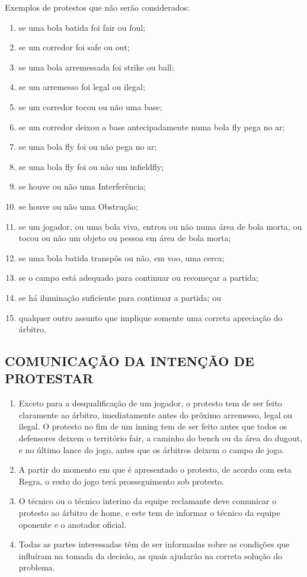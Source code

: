  Exemplos de protestos que não serão considerados:
\begin{exemplo}
\begin{enumerate}[label=(\alph*), itemsep=.75mm]
	\item se uma bola batida foi \gls{fair} ou \gls{foul};
	\item  se um corredor foi \gls{safe} ou \gls{out};
	\item  se uma bola arremessada foi \gls{strike} ou \gls{ball};
	\item  se um arremesso foi legal ou ilegal;
	\item  se um corredor tocou ou não uma base;
	\item  se um corredor deixou a base antecipadamente numa bola \gls{fly} pega no ar;
	\item  se uma bola \gls{fly} foi ou não pega no ar;
	\item  se uma bola \gls{fly} foi ou não um \gls{infieldfly};
	\item  se houve ou não uma Interferência;
	\item  se houve ou não uma Obstrução;
	\item  se um jogador, ou uma bola viva, entrou ou não numa área de bola morta, ou tocou ou não um objeto ou pessoa em área de bola morta;
	\item  se uma bola batida transpôs ou não, em voo, uma cerca;
	\item  se o campo está adequado para continuar ou recomeçar a partida;
	\item  se há iluminação suficiente para continuar a partida; ou
	\item  qualquer outro assunto que implique somente uma correta apreciação do árbitro.
\end{enumerate}
\end{exemplo}

\subsection{COMUNICAÇÃO DA INTENÇÃO DE PROTESTAR}
\begin{enumerate}[label=(\alph*)]
	\item  Exceto para a desqualificação de um jogador, o protesto tem de ser feito claramente ao árbitro, imediatamente antes do próximo arremesso, legal ou ilegal. O protesto no fim de um \gls{inning} tem de ser feito antes que todos os defensores deixem o território \gls{fair}, a caminho do \gls{bench} ou da área do \gls{dugout}, e no último lance do jogo, antes que os árbitros deixem o campo de jogo.
	\item  A partir do momento em que é apresentado o protesto, de acordo com esta Regra, o resto do jogo terá prosseguimento sob protesto.
	\item  O técnico ou o técnico interino da equipe reclamante deve comunicar o protesto ao árbitro de \gls{home}, e este tem de informar o técnico da equipe oponente e o anotador oficial.
	\item  Todas as partes interessadas têm de ser informadas sobre as condições que influíram na tomada da decisão, as quais ajudarão na correta solução do problema.
\end{enumerate}

